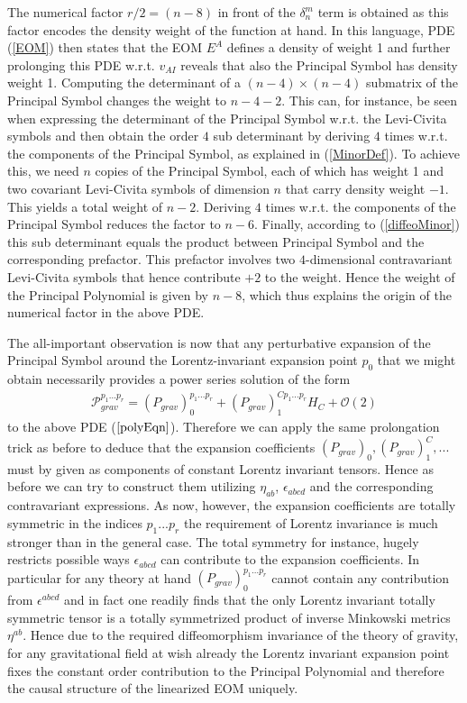 \documentclass[a4paper,12pt, DIV=14, BCOR=5mm, twoside, headsepline, numbers=noenddot]{scrbook}
\begin{document}
The numerical factor $r/2 = (n-8)$ in front of the $\delta^m_n$ term is obtained as this factor encodes the density weight of the function at hand. In this language, PDE (\ref{EOM}) then states that the EOM $E^A$ defines a density of weight 1 and further prolonging this PDE w.r.t. $v_{AI}$ reveals that also the Principal Symbol has density weight 1. Computing the determinant of a $(n-4) \times (n-4)$ submatrix of the Principal Symbol changes the weight to $n-4-2$. This can, for instance, be seen when expressing the determinant of the Principal Symbol w.r.t. the Levi-Civita symbols and then obtain the order $4$ sub determinant by deriving $4$ times w.r.t. the components of the Principal Symbol, as explained in (\ref{MinorDef}). To achieve this, we need $n$ copies of the Principal Symbol, each of which has weight 1 and two covariant Levi-Civita symbols of dimension $n$ that carry density weight $-1$. This yields a total weight of $n-2$. Deriving $4$ times w.r.t. the components of the Principal Symbol reduces the factor to $n-6$. Finally, according to (\ref{diffeoMinor}) this sub determinant equals the product between Principal Symbol and the corresponding prefactor. This prefactor involves two $4$-dimensional contravariant Levi-Civita symbols that hence contribute $+2$ to the weight. Hence the weight of the Principal Polynomial is given by $n-8$, which thus explains the origin of the numerical factor in the above PDE. 

The all-important observation is now that any perturbative expansion of the Principal Symbol around the Lorentz-invariant expansion point $p_0$ that we might obtain necessarily provides a power series solution of the form
\begin{align}
    \mathcal{P}_{grav}^{{p_1}...{p_{r}}} = (P_{grav})^{{p_1}...{p_{r}}}_0 + (P_{grav})_1^{C{p_1}...{p_{r}}} H_C + \mathcal{O}(2)
\end{align}
to the above PDE ($\ref{polyEqn}$). Therefore we can apply the same prolongation trick as before to deduce that the expansion coefficients $(P_{grav})_0, (P_{grav})_1^C,...$ must by given as components of constant Lorentz invariant tensors. Hence as before we can try to construct them utilizing $\eta_{ab}$, $\epsilon_{abcd}$ and the corresponding contravariant expressions. As now, however, the expansion coefficients are totally symmetric in the indices $p_1...p_r$ the requirement of Lorentz invariance is much stronger than in the general case. The total symmetry for instance, hugely restricts possible ways $\epsilon_{abcd}$ can contribute to the expansion coefficients. In particular for any theory at hand $(P_{grav})_0^{{p_1}...{p_{r}}}$ cannot contain any contribution from $\epsilon^{abcd}$ and in fact one readily finds that the only Lorentz invariant totally symmetric tensor is a totally symmetrized product of inverse Minkowski metrics $\eta^{ab}$. Hence due to the required diffeomorphism invariance of the theory of gravity, for any gravitational field at wish already the Lorentz invariant expansion point fixes the constant order contribution to the Principal Polynomial and therefore the causal structure of the linearized EOM uniquely.
\end{document}
